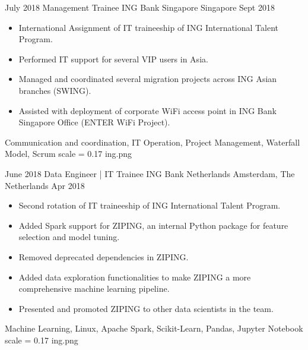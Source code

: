 \begin{experiences}
	\emptySeparator

	\experience
	{July 2018} {Management Trainee} {ING Bank Singapore} {Singapore}
	{Sept 2018}{
		\begin{itemize}
			\item International Assignment of IT traineeship of ING International Talent Program.
			\item Performed IT support for several VIP users in Asia.
			\item Managed and coordinated several migration projects across ING Asian branches (SWING).
			\item Assisted with deployment of corporate WiFi access point in ING Bank Singapore Office (ENTER WiFi Project).  
	\end{itemize}}
	{Communication and coordination, IT Operation, Project Management, Waterfall Model, Scrum}
	{scale = 0.17}		{ing.png} 
	
	\emptySeparator
	
	
	\experience
	{June 2018} {Data Engineer | IT Trainee} {ING Bank Netherlands} {Amsterdam, The Netherlands}
	{Apr 2018}{
		\begin{itemize}
			\item Second rotation of IT traineeship of ING International Talent Program.
			\item Added Spark support for ZIPING, an internal Python package for feature selection and model tuning.
			\item Removed deprecated dependencies in ZIPING.  
			\item Added data exploration functionalities to make ZIPING a more comprehensive machine learning pipeline.
			\item Presented and promoted ZIPING to other data scientists in the team. 
	\end{itemize}}
	{Machine Learning, Linux, Apache Spark, Scikit-Learn, Pandas, Jupyter Notebook}
	{scale = 0.17}		{ing.png} 
	
	\emptySeparator
	

\end{experiences}
